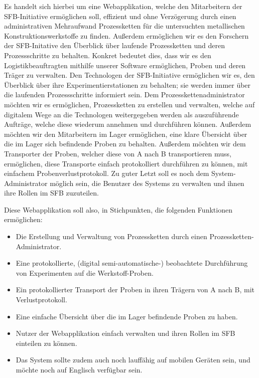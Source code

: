 \documentclass[enabledeprecatedfontcommands,fontsize=12pt,paper=a4,twoside]{scrartcl}
\begin{document}
Es handelt sich hierbei um eine Webapplikation, welche den Mitarbeitern der SFB-Initiative ermöglichen soll, effizient und ohne Verzögerung durch einen administrativen Mehraufwand Prozessketten für die untersuchten metallischen Konstruktionswerkstoffe zu finden. 
Außerdem ermöglichen wir es den Forschern der SFB-Initative den Überblick über laufende Prozessketten und deren Prozessschritte zu behalten. 
Konkret bedeutet dies, dass wir es den Logistikbeauftragten mithilfe unserer Software ermöglichen, Proben und deren Träger zu verwalten. Den Technologen der SFB-Initiative ermöglichen wir es, den Überblick über ihre Experimentierstationen zu behalten; sie werden immer über die laufenden Prozessschritte informiert sein.
Dem Prozesskettenadministrator möchten wir es ermöglichen, Prozessketten zu erstellen und verwalten, welche auf digitalem Wege an die Technologen weitergegeben werden als auszuführende Aufträge, welche diese wiederum annehmen und durchführen können.
Außerdem möchten wir den Mitarbeitern im Lager ermöglichen, eine klare Übersicht über die im Lager sich befindende Proben zu behalten.
Außerdem möchten wir dem Transporter der Proben, welcher diese von A nach B transportieren muss, ermöglichen, diese Transporte einfach protokolliert durchführen zu können, mit einfachem Probenverlustprotokoll. 
Zu guter Letzt soll es noch dem System-Administrator möglich sein, die Benutzer des Systems zu verwalten und ihnen ihre Rollen im SFB zuzuteilen.
 
Diese Webapplikation soll also, in Stichpunkten, die folgenden Funktionen ermöglichen:
\begin{itemize}
  \item Die Erstellung und Verwaltung von Prozessketten durch einen Prozessketten-Administrator.
  \item Eine protokollierte, (digital semi-automatische-) beobachtete Durchführung von Experimenten auf die Werkstoff-Proben. 
  \item Ein protokollierter Transport der Proben in ihren Trägern von A nach B, mit Verlustprotokoll.
  \item Eine einfache Übersicht über die im Lager befindende Proben zu haben.
  \item Nutzer der Webapplikation einfach verwalten und ihren Rollen im SFB einteilen zu können.
  \item Das System sollte zudem auch noch lauffähig auf mobilen Geräten sein, und möchte noch auf Englisch verfügbar sein.
\end{itemize}
\end{document}
